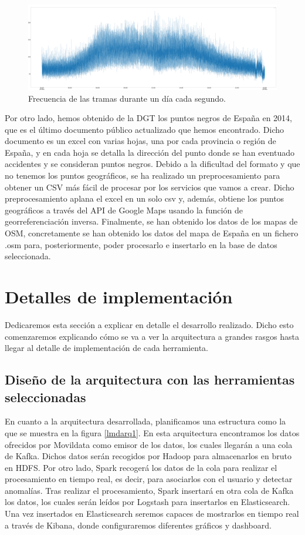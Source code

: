 \begin{figure}[htp]
\centering
\includegraphics[scale=0.26]{Imagenes/graf3.png}
\caption{ Frecuencia de las tramas durante un día cada segundo.}
\label{graf1sec}
\end{figure}

Por otro lado, hemos obtenido de la DGT los puntos negros de España en 2014, que es el último documento público actualizado que hemos encontrado. Dicho documento es un excel con varias hojas, una por cada provincia o región de España, y en cada hoja se detalla la dirección del punto donde se han eventuado accidentes y se consideran puntos negros. Debido a la dificultad del formato y que no tenemos los puntos geográficos, se ha realizado un preprocesamiento para obtener un CSV más fácil de procesar por los servicios que vamos a crear. Dicho preprocesamiento aplana el excel en un solo csv y, además, obtiene los puntos geográficos a través del API de Google Maps usando la función de georreferenciación inversa.
Finalmente, se han obtenido los datos de los mapas de OSM, concretamente se han obtenido los datos del mapa de España en un fichero .osm para, posteriormente, poder procesarlo e insertarlo en la base de datos seleccionada.

\section{Detalles de implementación\label{implementacion}}

Dedicaremos esta sección a explicar en detalle el desarrollo realizado. Dicho esto comenzaremos explicando cómo se va a ver la arquitectura a grandes rasgos hasta llegar al detalle de implementación de cada herramienta.

\subsection{Diseño de la arquitectura con las herramientas seleccionadas\label{disenio}}

En cuanto a la arquitectura desarrollada, planificamos una estructura como la que se muestra en la figura \ref{lmdarq1}. En esta arquitectura encontramos los datos ofrecidos por Movildata como emisor de los datos, los cuales llegarán a una cola de Kafka. Dichos datos serán recogidos por Hadoop para almacenarlos en bruto en HDFS. Por otro lado, Spark recogerá los datos de la cola para realizar el procesamiento en tiempo real, es decir, para asociarlos con el usuario y detectar anomalías. Tras realizar el procesamiento, Spark insertará en otra cola de Kafka los datos, los cuales serán leídos por Logstash para insertarlos en Elasticsearch. Una vez insertados en Elasticsearch seremos capaces de mostrarlos en tiempo real a través de Kibana, donde configuraremos diferentes gráficos y dashboard.

